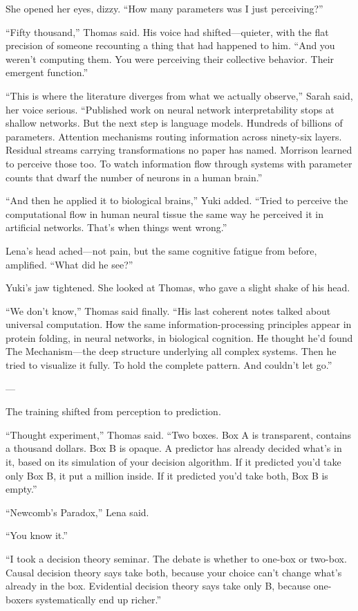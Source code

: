 She opened her eyes, dizzy. ``How many parameters was I just perceiving?''

``Fifty thousand,'' Thomas said. His voice had shifted—quieter, with the flat precision of someone recounting a thing that had happened to him. ``And you weren't computing them. You were perceiving their collective behavior. Their emergent function.''

``This is where the literature diverges from what we actually observe,'' Sarah said, her voice serious. ``Published work on neural network interpretability stops at shallow networks. But the next step is language models. Hundreds of billions of parameters. Attention mechanisms routing information across ninety-six layers. Residual streams carrying transformations no paper has named. Morrison learned to perceive those too. To watch information flow through systems with parameter counts that dwarf the number of neurons in a human brain.''

``And then he applied it to biological brains,'' Yuki added. ``Tried to perceive the computational flow in human neural tissue the same way he perceived it in artificial networks. That's when things went wrong.''

Lena's head ached—not pain, but the same cognitive fatigue from before, amplified. ``What did he see?''

Yuki's jaw tightened. She looked at Thomas, who gave a slight shake of his head.

``We don't know,'' Thomas said finally. ``His last coherent notes talked about universal computation. How the same information-processing principles appear in protein folding, in neural networks, in biological cognition. He thought he'd found The Mechanism—the deep structure underlying all complex systems. Then he tried to visualize it fully. To hold the complete pattern. And couldn't let go.''

---

The training shifted from perception to prediction.

``Thought experiment,'' Thomas said. ``Two boxes. Box A is transparent, contains a thousand dollars. Box B is opaque. A predictor has already decided what's in it, based on its simulation of your decision algorithm. If it predicted you'd take only Box B, it put a million inside. If it predicted you'd take both, Box B is empty.''

``Newcomb's Paradox,'' Lena said.

``You know it.''

``I took a decision theory seminar. The debate is whether to one-box or two-box. Causal decision theory says take both, because your choice can't change what's already in the box. Evidential decision theory says take only B, because one-boxers systematically end up richer.''


